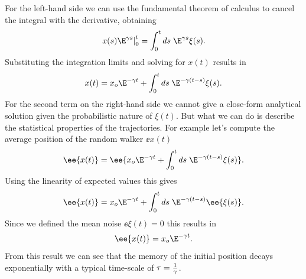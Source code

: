 For the left-hand side we can use the fundamental theorem of calculus to cancel
the integral with the derivative, obtaining
\begin{equation}
  \left. x(s)\E^{\gamma s} \right\vert_{0}^{t} =
  \int_0^t ds \; \E^{\gamma s} \xi(s).
\end{equation}
Substituting the integration limits and solving for $x(t)$ results in
\begin{equation}
  x(t) = x_o \E^{-\gamma t} + 
  \int_0^t ds \; \E^{-\gamma (t - s)} \xi(s).
  \label{eq_random_walk_sol}
\end{equation}
For the second term on the right-hand side we cannot give a close-form
analytical solution given the probabilistic nature of $\xi(t)$. But what we can
do is describe the statistical properties of the trajectories. For example
let's compute the average position of the random walker $\ee{x(t)}$
\begin{equation}
  \ee{x(t)} = \ee{x_o \E^{-\gamma t} + 
  \int_0^t ds \; \E^{-\gamma (t - s)} \xi(s)}.
\end{equation}
Using the linearity of expected values this gives
\begin{equation}
  \ee{x(t)} = x_o \E^{-\gamma t} +
  \int_0^t ds \; \E^{-\gamma (t - s)} \ee{\xi(s)}.
\end{equation}
Since we defined the mean noise $\ee{\xi(t)} = 0$ this results in
\begin{equation}
  \ee{x(t)} = x_o \E^{-\gamma t}.
  \label{eq_walker_mean}
\end{equation}
From this result we can see that the memory of the initial position decays
exponentially with a typical time-scale of $\tau = {1 \over \gamma}$.

